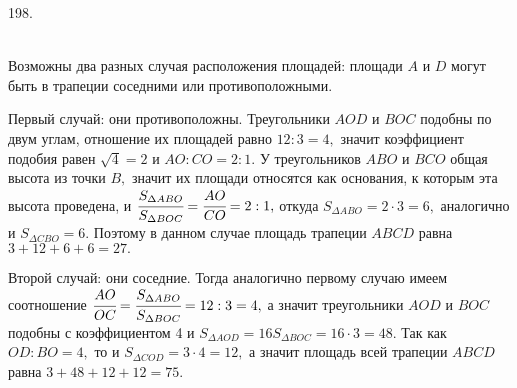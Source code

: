 198. \begin{figure}[ht!]
\end{figure}\\
Возможны два разных случая расположения площадей: площади $A$ и $D$ могут быть в трапеции соседними или противоположными.

Первый случай: они противоположны. Треугольники $AOD$ и $BOC$ подобны по двум углам, отношение их площадей равно $12:3=4,$ значит коэффициент подобия равен $\sqrt{4}=2$ и $AO:CO=2:1.$ У треугольников $ABO$ и $BCO$ общая высота из точки $B,$ значит их площади относятся как основания, к которым эта высота проведена, и $\cfrac{S_{\Delta ABO}}{S_{\Delta BOC}}=\cfrac{AO}{CO}=2:1,$ откуда $S_{\Delta ABO}=2\cdot3=6,$ аналогично и $S_{\Delta CBO}=6.$ Поэтому в данном случае площадь трапеции $ABCD$ равна $3+12+6+6=27.$

Второй случай: они соседние. Тогда аналогично первому случаю имеем соотношение $\cfrac{AO}{OC}=\cfrac{S_{\Delta ABO}}{S_{\Delta BOC}}=12:3=4,$ а значит треугольники $AOD$ и $BOC$ подобны с коэффициентом 4 и $S_{\Delta AOD}=16S_{\Delta BOC}=16\cdot3=48.$ Так как $OD:BO=4,$ то и $S_{\Delta COD}=3\cdot4=12,$ а значит площадь всей трапеции $ABCD$ равна $3+48+12+12=75.$\\
